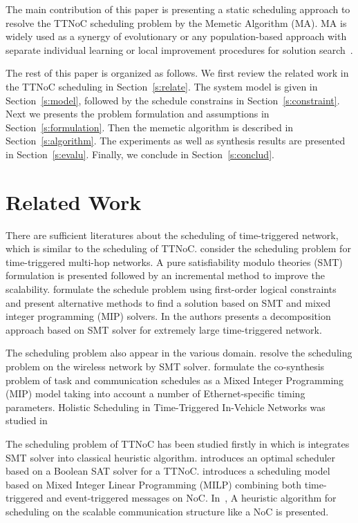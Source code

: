 \documentclass[journal]{IEEEtran}
\begin{document}
The main contribution of this paper is presenting a static scheduling approach to resolve the TTNoC scheduling problem by the Memetic Algorithm (MA). MA is widely used as a synergy of evolutionary or any population-based approach with separate individual learning or local improvement procedures for solution search~\cite{DBLP:journals/tec/ChenOLT11}. 

The rest of this paper is organized as follows. We first review the related work in the TTNoC scheduling in Section~\ref{s:relate}. 
The system model is given in Section~\ref{s:model}, followed by the schedule constrains in Section~\ref{s:constraint}.
Next we presents the problem formulation and assumptions in Section~\ref{s:formulation}.
Then the memetic algorithm is described in Section~\ref{s:algorithm}.
The experiments as well as synthesis results are presented in Section~\ref{s:evalu}.
Finally, we conclude in Section~\ref{s:conclud}.

\section{Related Work	\label{s:relate}}

There are sufficient literatures about the scheduling of time-triggered network, which is similar to the scheduling of TTNoC. 
\cite{DBLP:conf/rtss/Steiner10} consider the scheduling problem for time-triggered multi-hop networks. A pure satisfiability modulo theories (SMT) formulation is presented followed by an incremental method to improve the scalability.
\cite{DBLP:journals/rts/CraciunasO16,DBLP:conf/rtns/CraciunasO14} formulate the schedule problem using first-order logical constraints and present alternative methods to find a solution based on SMT and mixed integer programming (MIP) solvers.
In \cite{DBLP:conf/etfa/PozoSRH15} the authors presents a decomposition approach based on SMT solver for extremely large time-triggered network.

The scheduling problem also appear in the various domain.
\cite{DBLP:conf/isorc/RoRM15} resolve the scheduling problem on the wireless network by SMT solver.
\cite{DBLP:conf/aspdac/ZhangG0C14} formulate the co-synthesis problem of task and communication schedules as a Mixed Integer Programming (MIP) model taking into account a number of Ethernet-specific timing parameters.
Holistic Scheduling in Time-Triggered In-Vehicle Networks was studied in~\cite{DBLP:journals/tii/HuLWLZ14}

The scheduling problem of TTNoC has been
studied firstly in \cite{DBLP:conf/date/HuangBRBK12} which is integrates SMT solver into classical heuristic algorithm. 
\cite{DBLP:conf/sies/ScholerKMO15} introduces an optimal scheduler based on a Boolean SAT solver for a TTNoC.
\cite{DBLP:conf/indin/MurshedOAK15} introduces a scheduling model based on Mixed Integer Linear Programming (MILP) combining both time-triggered and event-triggered messages on NoC.
In~\cite{DBLP:conf/sies/FreierC15},
 A heuristic algorithm for scheduling on the scalable communication structure like a NoC is presented. 
\end{document}
